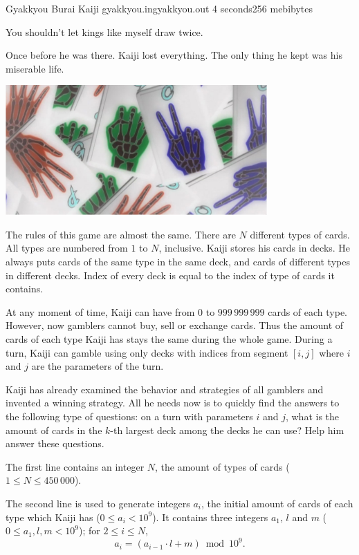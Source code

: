 \begin{problem}{Gyakkyou Burai Kaiji}
{gyakkyou.in}{gyakkyou.out}
{4 seconds}{256 mebibytes}


\epigraph
{
You shouldn't let kings like myself draw twice.
}{}

Once before he was there.
Kaiji lost everything.
The only thing he kept was his miserable life.

    \includegraphics [width=10cm]{pics/g.jpg}

The rules of this game are almost the same.
There are $N$ different types of cards.
All types are numbered from $1$ to $N$, inclusive.
Kaiji stores his cards in decks.
He always puts cards of the same type in the same deck,
and cards of different types in different decks.
Index of every deck is equal to the index of type of cards it contains.

At any moment of time, Kaiji can have from $0$ to $999\,999\,999$ cards
of each type.
However, now gamblers cannot buy, sell or exchange cards.
Thus the amount of cards of each type Kaiji has
stays the same during the whole game.
During a turn, Kaiji can gamble using only decks with indices
from segment $[i, j]$ where $i$ and $j$ are the parameters of the turn.

Kaiji has already examined the behavior and strategies of all gamblers
and invented a winning strategy.
All he needs now is to quickly find the answers to the following type
of questions:
on a turn with parameters $i$ and $j$, what is the amount of cards
in the $k$-th largest deck among the decks he can use?
Help him answer these questions.

\InputFile

The first line contains an integer $N$, the amount of types of cards
($1 \leq N \leq 450\,000$). 

The second line is used to generate integers $a_i$, the initial amount
of cards of each type which Kaiji has ($0 \leq a_i < 10^9$).
It contains three integers $a_1$, $l$ and $m$
($0 \leq a_1, l, m < 10^9$); for $2 \leq i \leq N$,
$$a_i = (a_{i-1} \cdot l + m) \bmod 10^9\text{.}$$


\end{problem}
